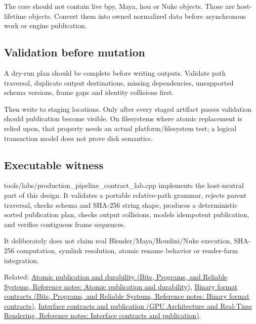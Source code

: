 The core should not contain live bpy, Maya, hou or Nuke objects. Those are host-lifetime objects. Convert them into owned normalized data before asynchronous work or engine publication.

\subsection{Validation before mutation}\label{appendix-03ade9e1875f-validation-before-mutation}

A dry-run plan should be complete before writing outputs. Validate path traversal, duplicate output destinations, missing dependencies, unsupported schema versions, frame gaps and identity collisions first.

Then write to staging locations. Only after every staged artifact passes validation should publication become visible. On filesystems where atomic replacement is relied upon, that property needs an actual platform/filesystem test; a logical transaction model does not prove disk semantics.

\subsection{Executable witness}\label{appendix-03ade9e1875f-executable-witness}

tools/labs/production\_pipeline\_contract\_lab.cpp implements the host-neutral part of this design. It validates a portable relative-path grammar, rejects parent traversal, checks schema and SHA-256 string shape, produces a deterministic sorted publication plan, checks output collisions, models idempotent publication, and verifies contiguous frame sequences.

It deliberately does not claim real Blender/Maya/Houdini/Nuke execution, SHA-256 computation, symlink resolution, atomic rename behavior or render-farm integration.

Related: \href{../01-Bits-Programs-and-Reliable-Systems/main.pdf\#nameddest=appendix-e89a8f290ef5}{Atomic publication and durability (Bits, Programs, and Reliable Systems, Reference notes: Atomic publication and durability)}, \href{../01-Bits-Programs-and-Reliable-Systems/main.pdf\#nameddest=appendix-590bbb2424c1}{Binary format contracts (Bits, Programs, and Reliable Systems, Reference notes: Binary format contracts)}, \href{../06-GPU-Architecture-and-Real-Time-Rendering/main.pdf\#nameddest=appendix-fdae7ff0a23f}{Interface contracts and publication (GPU Architecture and Real-Time Rendering, Reference notes: Interface contracts and publication)}.

